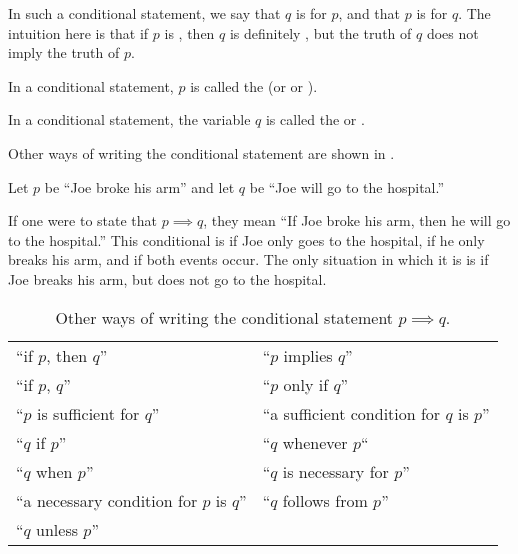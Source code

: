 In such a conditional statement,
we say that $q$ is  for $p$,
and that $p$ is  for $q$.
The intuition here is that if $p$ is \ltrue{}, then $q$ is definitely \ltrue{},
but the truth of $q$ does not imply the truth of $p$.

\begin{defn}[hypothesis]
  In a conditional statement, $p$ is called the 
  (or  or ).
\end{defn}

\begin{defn}[conclusion]
  In a conditional statement, the variable $q$ is called the 
  or .

  Other ways of writing the conditional statement are shown in .
\end{defn}

\begin{ex}
  Let $p$ be ``Joe broke his arm''
  and let $q$ be ``Joe will go to the hospital.''

  If one were to state that $p \implies q$, they mean
  ``If Joe broke his arm, then he will go to the hospital.''
  This conditional is \ltrue{} if Joe only goes to the hospital,
  if he only breaks his arm, and if both events occur.
  The only situation in which it is \lfalse{} is if Joe breaks his arm,
  but does not go to the hospital.
\end{ex}

\begin{table}[H]
  \centering
    \begin{tabular}{p{2in} p{2in}}
      ``if \(p\), then \(q\)''                     & ``\(p\) implies \(q\)'' \\
      ``if \(p\), \(q\)''                          & ``\(p\) only if \(q\)'' \\
      ``\(p\) is sufficient for \(q\)''            & ``a sufficient condition for \(q\) is \(p\)'' \\
      ``\(q\) if \(p\)''                           & ``\(q\) whenever \(p\)`` \\
      ``\(q\) when \(p\)''                         & ``\(q\) is necessary for \(p\)'' \\
      ``a necessary condition for \(p\) is \(q\)'' & ``\(q\) follows from \(p\)'' \\
      ``\(q\) unless \(p\)''
    \end{tabular}
  \caption{Other ways of writing the conditional statement \(p \implies q\).}
  \label{tab:conditionals}
\end{table}


